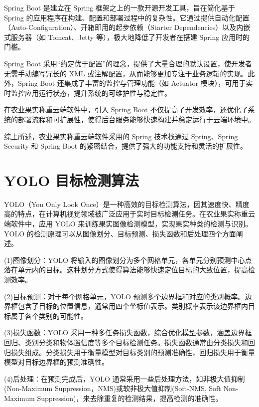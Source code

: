 Spring Boot 是建立在 Spring 框架之上的一款开源开发工具，旨在简化基于 Spring 的应用程序在构建、配置和部署过程中的复杂性。它通过提供自动化配置（Auto-Configuration）、开箱即用的起步依赖（Starter Dependencies）以及内嵌式服务器（如 Tomcat、Jetty 等），极大地降低了开发者在搭建 Spring 应用时的门槛\cite{Spring-Boot-概述}。

Spring Boot 采用“约定优于配置”的理念，提供了大量合理的默认设置，使开发者无需手动编写冗长的 XML 或注解配置，从而能够更加专注于业务逻辑的实现。此外，Spring Boot 还集成了丰富的监控与管理功能（如 Actuator 模块），可用于实时监控应用运行状态，提升系统的可维护性与稳定性。

在农业果实称重云端软件中，引入 Spring Boot 不仅提高了开发效率，还优化了系统的部署流程和可扩展性，使得后台服务能够快速构建并稳定运行于云端环境中。

综上所述，农业果实称重云端软件采用的 Spring 技术栈通过 Spring、Spring Security 和 Spring Boot 的紧密结合，提供了强大的功能支持和灵活的扩展性。

\section{YOLO 目标检测算法}\label{sec:yolo}

YOLO（You Only Look Once）是一种高效的目标检测算法，因其速度快、精度高的特点，在计算机视觉领域被广泛应用于实时目标检测任务\cite{Lin2019}。在农业果实称重云端软件中，应用 YOLO 来训练果实图像检测模型，实现果实种类的检测与识别。YOLO 的检测原理可以从图像划分、目标预测、损失函数和后处理四个方面阐述。

(1)图像划分：YOLO 将输入的图像划分为多个网格单元，各单元分别预测中心点落在单元内的目标。这种划分方式使得算法能够快速定位目标的大致位置，提高检测效率\cite{Liu2023-yolov8}。

(2)目标预测：对于每个网格单元，YOLO 预测多个边界框和对应的类别概率。边界框包含了目标的位置信息，通常用四个坐标值表示。类别概率表示该边界框内目标属于各个类别的可能性\cite{Liu2023-yolov8}。

(3)损失函数：YOLO 采用一种多任务损失函数，综合优化模型参数，涵盖边界框回归、类别分类和物体置信度等多个目标检测任务\cite{Liu2023-yolov8}。损失函数通常由分类损失和回归损失组成。分类损失用于衡量模型对目标类别的预测准确性，回归损失用于衡量模型对目标边界框的预测准确性。

(4)后处理：在预测完成后，YOLO 通常采用一些后处理方法，如非极大值抑制(Non-Maximum Suppression，NMS)或软非极大值抑制(Soft-NMS, Soft Non-Maximum Suppression)\cite{Lin2019}，来去除重复的检测结果，提高检测的准确性。


